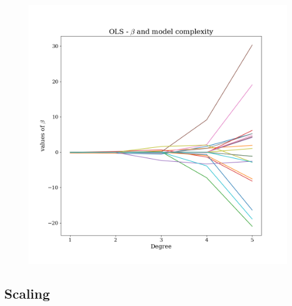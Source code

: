 \documentclass[twoside,11pt]{report}
\begin{document}
\begin{figure}[!h]
    \begin{center}
        \includegraphics{../runsAndAdditions/betaOverOrderOLS.png}
    \end{center}
\end{figure}










\subsection{Scaling}
\label{sec:scaling}
\end{document}
